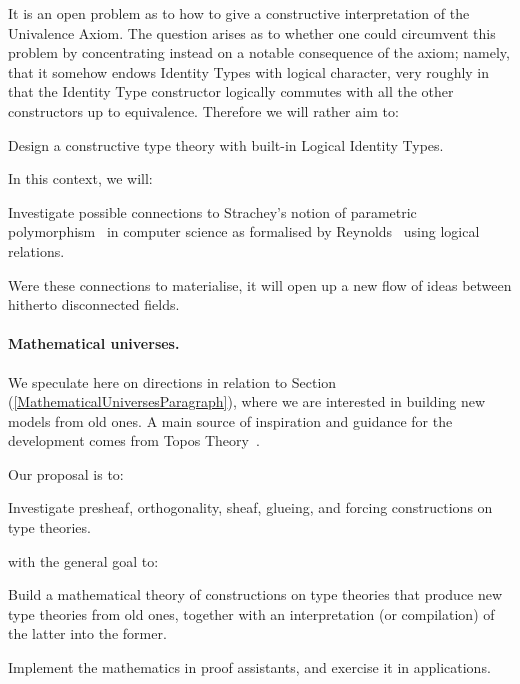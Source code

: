 \documentclass[11pt,twocolumn]{article}
\newcounter{CC}
\newenvironment{resenumerate}
  {\begin{list}{[\textbf{\arabic{CC}]}}
  {\usecounter{CC}
   \setlength{\topsep}{2pt}
   \setlength{\partopsep}{2pt}
   \setlength{\itemsep}{2.5pt}
   \setlength{\parsep}{2.5pt}
   \setlength{\leftmargin}{1.65em}
   \setlength{\labelwidth}{1.15em}
 }}
  {\end{list}}
\newcommand{\pref}[1]{\,(\ref{#1})}
\begin{document}
It is an open problem as to how to give a constructive interpretation of the
Univalence Axiom.  The question arises as to whether one could circumvent this
problem by concentrating instead on a notable consequence of the axiom;
namely, that it somehow endows Identity Types with logical character, very
roughly in that the Identity Type constructor logically commutes with all the
other constructors up to equivalence.  Therefore we will rather aim to:
\begin{resenumerate}\setcounter{CC}{7}
\item 
  Design a constructive type theory with built-in Logical Identity Types.
\end{resenumerate}
In this context, we will:
\begin{resenumerate}\setcounter{CC}{8}
\item
  Investigate possible connections to Strachey's notion of parametric
  polymorphism~\cite{Strachey1967} in computer science as formalised by
  Reynolds~\cite{Reynolds} using logical relations.
\end{resenumerate}
Were these connections to materialise, it will open up a new flow of ideas
between hitherto disconnected fields.

\paragraph{Mathematical universes.}
\label{MethodologyMathematicalUniversesParagraph}

We speculate here on directions in relation to
Section\pref{MathematicalUniversesParagraph}, where we are interested in
building new models from old ones.  A main source of inspiration and
guidance for the development comes from Topos Theory~\cite{Elephant}.

Our proposal is to:
\begin{resenumerate}\setcounter{CC}{0}
\item\label{ConstructionsOnTypeTheories}
  Investigate presheaf, orthogonality, sheaf, glueing, and forcing
  constructions on type theories.
\end{resenumerate}
with the general goal to:
\begin{resenumerate}\setcounter{CC}{1}
\item
  Build a mathematical theory of constructions on type theories that
  produce new type theories from old ones, together with an interpretation
  (or compilation) of the latter into the former.
  
\item \label{MMUPAppItem}
  Implement the mathematics in proof assistants, and exercise it in
  applications.  
\end{resenumerate}
\end{document}
